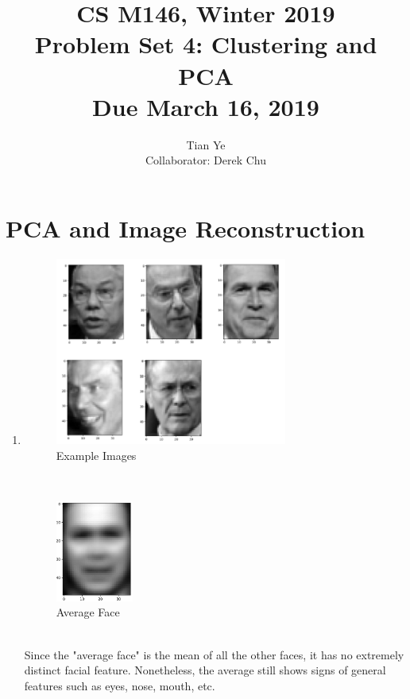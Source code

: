 \documentclass[11pt]{article}
\newcommand{\cnum}{CS M146}
\newcommand{\ced}{Winter 2019}
\newcommand{\ctitle}[3]{\title{\vspace{-0.5in}\cnum, \ced\\Problem Set #1: #2\\Due #3}}
\newcommand{\solution}[1]{{{\color{blue}{\bf Solution:} {#1}}}}
\begin{document}
\ctitle{4}{Clustering and PCA}{March 16, 2019}
\author{Tian Ye \\ \small{Collaborator: Derek Chu}}
\maketitle

\newpage

\section{PCA and Image Reconstruction}
\begin{enumerate}
\item 
\solution{
\begin{figure}[!htbp]
    \centering
    \includegraphics[width=3in]{atotal.png}
    \caption{Example Images} 
\end{figure} \\
\begin{figure}[!htbp]
    \centering
    \includegraphics[width=1in]{a6.png}
    \caption{Average Face}
\end{figure} \\
Since the "average face" is the mean of all the other faces, it has no extremely distinct facial feature. Nonetheless, the average still shows signs of general features such as eyes, nose, mouth, etc.
}
\vspace{1cm}
\newpage


\end{enumerate}
\end{document}
